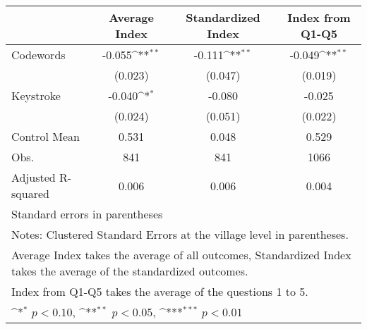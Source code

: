 {
\def\sym#1{\ifmmode^{#1}\else\(^{#1}\)\fi}
\begin{tabular}{l*{3}{c}}
\toprule
                &\multicolumn{1}{c}{Average Index}&\multicolumn{1}{c}{Standardized Index}&\multicolumn{1}{c}{Index from Q1-Q5}\\
\midrule
Codewords       &   -0.055\sym{**} &   -0.111\sym{**} &   -0.049\sym{**} \\
                &  (0.023)         &  (0.047)         &  (0.019)         \\
Keystroke       &   -0.040\sym{*}  &   -0.080         &   -0.025         \\
                &  (0.024)         &  (0.051)         &  (0.022)         \\
\midrule
Control Mean    &    0.531         &    0.048         &    0.529         \\
Obs.            &      841         &      841         &     1066         \\
Adjusted R-squared&    0.006         &    0.006         &    0.004         \\
\bottomrule
\multicolumn{4}{l}{\footnotesize Standard errors in parentheses}\\
\multicolumn{4}{l}{\footnotesize Notes: Clustered Standard Errors at the village level in parentheses.}\\
\multicolumn{4}{l}{\footnotesize Average Index takes the average of all outcomes, Standardized Index takes the average of the standardized outcomes.}\\
\multicolumn{4}{l}{\footnotesize Index from Q1-Q5 takes the average of the questions 1 to 5.}\\
\multicolumn{4}{l}{\footnotesize \sym{*} \(p<0.10\), \sym{**} \(p<0.05\), \sym{***} \(p<0.01\)}\\
\end{tabular}
}

